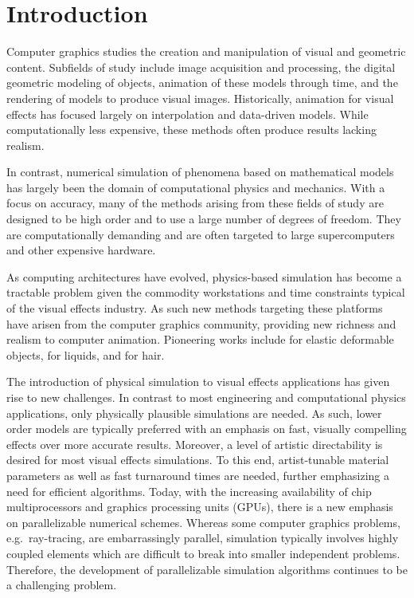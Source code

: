 \chapter{Introduction}
Computer graphics studies the creation and manipulation of visual and
geometric content.  Subfields of study include image acquisition and
processing, the digital geometric modeling of objects, animation of these
models through time, and the rendering of models to produce visual
images.  Historically, animation for visual effects has focused largely on interpolation and
data-driven models.  While computationally less expensive, these
methods often produce results lacking realism.

In contrast, numerical simulation of phenomena based on mathematical
models has largely been the domain of computational physics and
mechanics.  With a focus on accuracy, many of the methods arising from
these fields of study are designed to be high order and to use a large
number of degrees of freedom. They are computationally demanding and
are often targeted to large supercomputers and other expensive
hardware.
  
As computing architectures have evolved, physics-based
simulation has become a tractable problem given the commodity
workstations and time constraints typical of the visual effects
industry.  As such new methods targeting these platforms have arisen from
the computer graphics community, providing new richness and realism to
computer animation.  Pioneering works include
\cite{terzopoulos:1987:elastic} for elastic deformable objects,
\cite{Foster:1996:RAO} for liquids, and \cite{rosenblum:1991:hair} for
hair.  

The introduction of physical simulation to visual effects
applications has given rise to new challenges. In contrast to most
engineering and computational physics applications, only physically
plausible simulations are needed.  As such, lower order models are
typically preferred with an emphasis on fast, visually compelling
effects over more accurate results.  Moreover, a level of artistic
directability is desired for most visual effects simulations. To this
end, artist-tunable material parameters as well as fast turnaround
times are needed, further emphasizing a need for efficient algorithms.
Today, with the increasing availability of chip multiprocessors and
graphics processing units (GPUs), there is a new emphasis on parallelizable
numerical schemes. Whereas some computer graphics problems, e.g.\ ray-tracing, are embarrassingly parallel, simulation typically
involves highly coupled elements which are difficult to break into
smaller independent problems.  Therefore, the development of
parallelizable simulation algorithms continues to be a challenging
problem.

